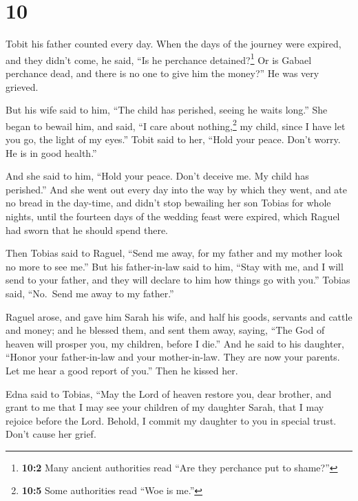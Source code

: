 \hypertarget{section-9}{%
\section{10}\label{section-9}}

 Tobit his father counted every day. When the days of the
journey were expired, and they didn't come,  he said, ``Is
he perchance detained?\footnote{\textbf{10:2} Many ancient authorities
  read ``Are they perchance put to shame?''} Or is Gabael perchance
dead, and there is no one to give him the money?''  He was
very grieved.

 But his wife said to him, ``The child has perished,
seeing he waits long.'' She began to bewail him, and said,
 ``I care about nothing,\footnote{\textbf{10:5} Some
  authorities read ``Woe is me.''} my child, since I have let you go,
the light of my eyes.''  Tobit said to her, ``Hold your
peace. Don't worry. He is in good health.''

 And she said to him, ``Hold your peace. Don't deceive me.
My child has perished.'' And she went out every day into the way by
which they went, and ate no bread in the day-time, and didn't stop
bewailing her son Tobias for whole nights, until the fourteen days of
the wedding feast were expired, which Raguel had sworn that he should
spend there.

Then Tobias said to Raguel, ``Send me away, for my father and my mother
look no more to see me.''  But his father-in-law said to
him, ``Stay with me, and I will send to your father, and they will
declare to him how things go with you.''  Tobias said,
``No.~Send me away to my father.''

 Raguel arose, and gave him Sarah his wife, and half his
goods, servants and cattle and money;  and he blessed
them, and sent them away, saying, ``The God of heaven will prosper you,
my children, before I die.''  And he said to his
daughter, ``Honor your father-in-law and your mother-in-law. They are
now your parents. Let me hear a good report of you.'' Then he kissed
her.

Edna said to Tobias, ``May the Lord of heaven restore you, dear brother,
and grant to me that I may see your children of my daughter Sarah, that
I may rejoice before the Lord. Behold, I commit my daughter to you in
special trust. Don't cause her grief.

